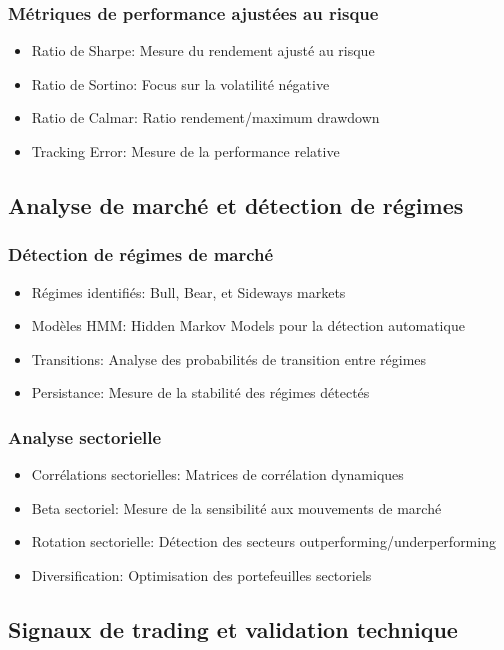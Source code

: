 \documentclass[12pt,a4paper]{article}
\begin{document}
\subsubsection{Métriques de performance ajustées au risque}
\begin{itemize}
    \item Ratio de Sharpe: Mesure du rendement ajusté au risque
    \item Ratio de Sortino: Focus sur la volatilité négative
    \item Ratio de Calmar: Ratio rendement/maximum drawdown
    \item Tracking Error: Mesure de la performance relative
\end{itemize}

\subsection{Analyse de marché et détection de régimes}
\subsubsection{Détection de régimes de marché}
\begin{itemize}
    \item Régimes identifiés: Bull, Bear, et Sideways markets
    \item Modèles HMM: Hidden Markov Models pour la détection automatique
    \item Transitions: Analyse des probabilités de transition entre régimes
    \item Persistance: Mesure de la stabilité des régimes détectés
\end{itemize}

\subsubsection{Analyse sectorielle}
\begin{itemize}
    \item Corrélations sectorielles: Matrices de corrélation dynamiques
    \item Beta sectoriel: Mesure de la sensibilité aux mouvements de marché
    \item Rotation sectorielle: Détection des secteurs outperforming/underperforming
    \item Diversification: Optimisation des portefeuilles sectoriels
\end{itemize}

\subsection{Signaux de trading et validation technique}
\end{document}
